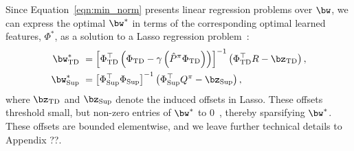 Since Equation~\ref{eqn:min_norm} presents linear regression problems over $\bw$, we can express the optimal $\bw^*$ in terms of the corresponding optimal learned features, $\Phi^*$, as a solution to a Lasso regression problem~\citep{hastie2015sparsity}:
\begin{align}
    \bw^*_{\mathrm{TD}} ~&= \left[\Phi_{\mathrm{TD}}^\top \left(\Phi_{\mathrm{TD}} - \gamma \left(\hat{P}^\pi \Phi_{\mathrm{TD}} \right) \right)\right]^{-1} \left( \Phi_{\mathrm{TD}}^\top R - \bz_\mathrm{TD} \right),  \label{eqn:td_soln} \\
    \bw^*_{\mathrm{Sup}} ~&= \left[\Phi_{\mathrm{Sup}}^\top \Phi_{\mathrm{Sup}}\right]^{-1} \left(\Phi_{\mathrm{Sup}}^\top Q^\pi - \bz_{\mathrm{Sup}}\right)  \label{eqn:sup_soln},
\end{align}
where $\bz_\mathrm{TD}$ and $\bz_{\mathrm{Sup}}$ denote the induced offsets in Lasso.
These offsets threshold small,
but non-zero entries of $\bw^*$ to 0~\citep{hastie2015sparsity}, thereby sparsifying $\bw^*$. These offsets are bounded elementwise, and we leave further technical details to Appendix ??.  

